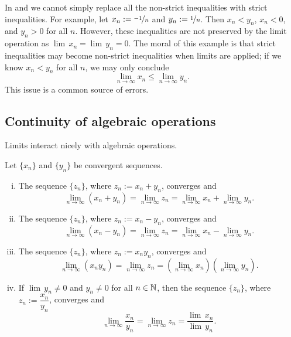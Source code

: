 In  and  we cannot simply replace
all the non-strict inequalities with
strict inequalities.  For example,
let $x_n := \nicefrac{-1}{n}$ and $y_n := \nicefrac{1}{n}$.
Then $x_n < y_n$, $x_n < 0$,
and $y_n > 0$ for all $n$.  However, these inequalities are
not preserved by the limit operation as
$\lim\, x_n = \lim\, y_n = 0$.
The moral of this example is that strict inequalities may become non-strict
inequalities when limits are applied; if we know
$x_n < y_n$ for all $n$,
we may only conclude 
\begin{equation*}
\lim_{n \to \infty} x_n \leq
\lim_{n \to \infty} y_n .
\end{equation*}
This issue is a common source of errors.

\subsection{Continuity of algebraic operations}

Limits interact nicely with algebraic operations.

\begin{prop} \label{prop:contalg}
Let $\{ x_n \}$ and $\{ y_n \}$ be convergent sequences.
\begin{enumerate}[(i)]
\item \label{prop:contalg:i}
The sequence $\{ z_n \}$, where $z_n := x_n + y_n$, converges and
\begin{equation*}
\lim_{n \to \infty} (x_n + y_n) = 
\lim_{n \to \infty} z_n = 
\lim_{n \to \infty} x_n + 
\lim_{n \to \infty} y_n .
\end{equation*}
\item \label{prop:contalg:ii}
The sequence $\{ z_n \}$, where $z_n := x_n - y_n$, converges and
\begin{equation*}
\lim_{n \to \infty} (x_n - y_n) = 
\lim_{n \to \infty} z_n = 
\lim_{n \to \infty} x_n - 
\lim_{n \to \infty} y_n .
\end{equation*}
\item \label{prop:contalg:iii}
The sequence $\{ z_n \}$, where $z_n := x_n y_n$, converges and
\begin{equation*}
\lim_{n \to \infty} (x_n y_n) = 
\lim_{n \to \infty} z_n = 
\left( \lim_{n \to \infty} x_n \right)
\left( \lim_{n \to \infty} y_n \right) .
\end{equation*}
\item \label{prop:contalg:iv}
If $\lim\, y_n \not= 0$ and $y_n \not= 0$ for all $n \in {\mathbb{N}}$, then
the sequence $\{ z_n \}$, where $z_n := \dfrac{x_n}{y_n}$, converges and
\begin{equation*}
\lim_{n \to \infty} \frac{x_n}{y_n} = 
\lim_{n \to \infty} z_n = 
\frac{\lim\, x_n}{\lim\, y_n} .
\end{equation*}
\end{enumerate}
\end{prop}

